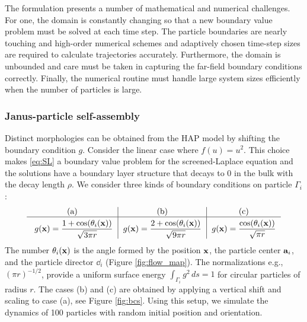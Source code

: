 
The formulation presents a number of mathematical and numerical
challenges. For one, the domain is constantly changing so that a new
boundary value problem must be solved at each time step. The particle
boundaries are nearly touching and high-order numerical
schemes and adaptively chosen time-step sizes
are required to calculate trajectories accurately.
Furthermore, the domain is unbounded and care must be taken 
in capturing the far-field boundary conditions correctly. 
Finally, the numerical routine must handle large system sizes
efficiently when the number of particles is large. 


\subsubsection{Janus-particle self-assembly} 
Distinct morphologies can be obtained from 
the HAP model by shifting the boundary condition $g$.
Consider the linear case where $f(u) = u^2$.
This choice makes \eqref{eq:SL} a boundary value
problem for the screened-Laplace equation
and the solutions have a boundary layer structure that decays to $0$ in the
bulk with the decay length $\rho$.
We consider three kinds of boundary conditions
on particle $\Gamma_i$:
\begin{equation}
  \label{eq:bcs}
  \begin{tabular}{c|c|c}
     \text{(a)} & \text{(b)} & \text{(c)} \\
    \hline
    \rule{0pt}{4ex} 
      $g(\mathbf{x}) = \displaystyle \frac{1+\cos (\theta_i(\xx))}{\sqrt{3\pi r}}$
    & $g(\mathbf{x}) = \displaystyle \frac{2+\cos (\theta_i(\xx))}{\sqrt{9\pi r}}$
    & $g(\mathbf{x}) = \displaystyle \frac{\cos (\theta_i(\xx))}{\sqrt{\pi r}}$
\end{tabular}
\end{equation}
  The number $\theta_i(\xx)$ is the angle formed by the position $\xx$, the
particle center $\aa_i$, and the particle director $\dd_i$ (Figure \ref{fig:flow_map}).
The normalizations e.g., $(\pi r)^{-1/2}$, provide a uniform
surface energy $\int_{\Gamma_i} g^2 \,ds = 1$ for circular particles
of radius $r$. 
The cases (b) and (c) are obtained by applying a vertical shift
and scaling to case (a), see Figure \ref{fig:bcs}.
Using this setup, we simulate the dynamics of 100 particles with random
initial position and orientation.

